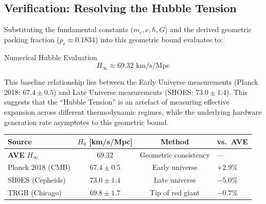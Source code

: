 \subsection{Verification: Resolving the Hubble Tension}
Substituting the fundamental constants ($m_e, c, \hbar, G$) and the derived geometric packing fraction ($p_c \approx 0.1834$) into this geometric bound evaluates to:
\begin{resultbox}{Numerical Hubble Evaluation}
\begin{equation}
    H_{\infty} \approx 69.32 \text{ km/s/Mpc}
\end{equation}
\end{resultbox}
This baseline relationship lies between the Early Universe measurements (Planck 2018: $67.4 \pm 0.5$) and Late Universe measurements (SHOES: $73.0 \pm 1.4$). This suggests that the ``Hubble Tension'' is an artefact of measuring effective expansion across different thermodynamic regimes, while the underlying hardware generation rate asymptotes to this geometric bound.

\begin{center}
\small
\renewcommand{\arraystretch}{1.2}
\begin{tabularx}{\textwidth}{@{}lccX@{}}
\toprule
\textbf{Source} & \textbf{$H_0$ [km/s/Mpc]} & \textbf{Method} & \textbf{vs.\ AVE} \\
\midrule
\textbf{AVE} $H_\infty$   & $\mathbf{69.32}$ & Geometric consistency & --- \\
Planck 2018 (CMB)   & $67.4 \pm 0.5$  & Early universe  & $+2.9\%$ \\
SH0ES (Cepheids)    & $73.0 \pm 1.4$  & Late universe   & $-5.0\%$ \\
TRGB (Chicago)      & $69.8 \pm 1.7$  & Tip of red giant & $-0.7\%$ \\
\bottomrule
\end{tabularx}
\end{center}

